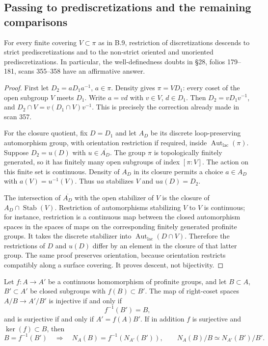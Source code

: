 \subsection{Passing to prediscretizations and the remaining comparisons}

For every finite covering $V\subset\pi$ as in B.9, restriction of
discretizations descends to strict prediscretizations and to the
non-strict oriented and unoriented prediscretizations.  In
particular, the well-definedness doubts in \S28, folios 179--181,
scans 355--358 have an affirmative answer.

\begin{proof}
First let $D_2=aD_1a^{-1}$, $a\in\pi$.  Density gives
$\pi=VD_1$: every coset of the open subgroup $V$ meets $D_1$.
Write $a=vd$ with $v\in V$, $d\in D_1$.  Then
$D_2=vD_1v^{-1}$, and
$D_2\cap V=v(D_1\cap V)v^{-1}$.  This is precisely the correction
already made in scan 357.

For the closure quotient, fix $D=D_1$ and let $A_D$ be its discrete
loop-preserving automorphism group, with orientation restriction
if required, inside $\operatorname{Aut}_{\mathrm{lac}}(\pi)$.
Suppose $D_2=u(D)$ with $u\in\overline{A_D}$.  The group $\pi$ is
topologically finitely generated, so it has finitely many open
subgroups of index $[\pi:V]$.  The action on this finite set is
continuous.  Density of $A_D$ in its closure permits a choice
$a\in A_D$ with $a(V)=u^{-1}(V)$.  Thus $ua$ stabilizes $V$ and
$ua(D)=D_2$.

The intersection of $\overline{A_D}$ with the open stabilizer of
$V$ is the closure of $A_D\cap\operatorname{Stab}(V)$.
Restriction of automorphisms stabilizing $V$ to $V$ is continuous;
for instance, restriction is a continuous map between the closed
automorphism spaces in the spaces of maps on the corresponding
finitely generated profinite groups.  It takes the discrete
stabilizer into $\operatorname{Aut}_{\mathrm{lac}}(D\cap V)$.
Therefore the restrictions of $D$ and $u(D)$ differ by an element
in the closure of that latter group.  The same proof preserves
orientation, because orientation restricts compatibly along a
surface covering.  It proves descent, not bijectivity.
\end{proof}

Let $f:A\to A'$ be a continuous homomorphism of profinite groups,
and let $B\subset A$, $B'\subset A'$ be closed subgroups with
$f(B)\subset B'$.  The map of right-coset spaces
$A/B\to A'/B'$ is injective if and only if
\[
 f^{-1}(B')=B,
\]
and is surjective if and only if $A'=f(A)B'$.  If in addition
$f$ is surjective and $\ker(f)\subset B$, then
\[
 B=f^{-1}(B')\quad\Longrightarrow\quad
 N_A(B)=f^{-1}(N_{A'}(B')),
 \qquad N_A(B)/B\simeq N_{A'}(B')/B'.
\]


